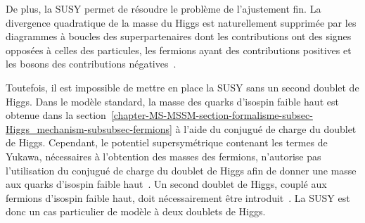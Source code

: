 De plus, la SUSY permet de résoudre le problème de l'ajustement fin.
La divergence quadratique de la masse du Higgs est naturellement supprimée par les diagrammes à boucles des superpartenaires dont les contributions ont des signes opposées à celles des particules, les fermions ayant des contributions positives et les bosons des contributions négatives~\cite{Higgs_hunter_guide}.
\par Toutefois, il est impossible de mettre en place la SUSY sans un second doublet de Higgs.
Dans le modèle standard, la masse des quarks d'isospin faible haut est obtenue dans la section~\ref{chapter-MS-MSSM-section-formalisme-subsec-Higgs_mechanism-subsubsec-fermions} à l'aide du conjugué de charge du doublet de Higgs.
Cependant, le potentiel supersymétrique contenant les termes de Yukawa, nécessaires à l'obtention des masses des fermions, n'autorise pas l'utilisation du conjugué de charge du doublet de Higgs afin de donner une masse aux quarks d'isospin faible haut~\cite{Nagashima_BSM}.
Un second doublet de Higgs, couplé aux fermions d'isospin faible haut, doit nécessairement être introduit~\cite{Nagashima_BSM,Higgs_hunter_guide}.
La SUSY est donc un cas particulier de modèle à deux doublets de Higgs.
